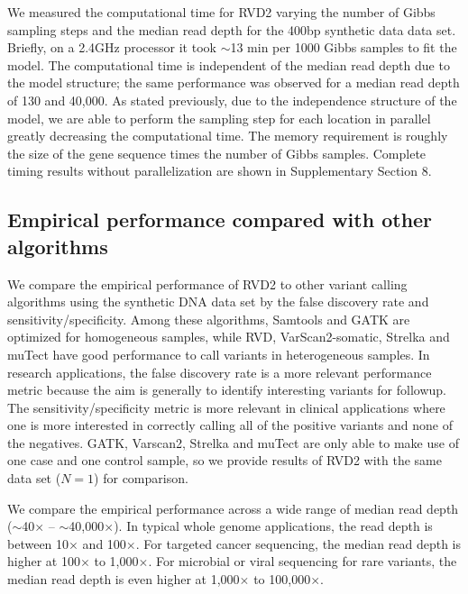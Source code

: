 \documentclass{bioinfo}
\begin{document}
We measured the computational time for RVD2 varying the number of Gibbs sampling steps and the median read depth for the 400bp synthetic data data set. 
Briefly, on a 2.4GHz processor it took $\sim$13 min per 1000 Gibbs samples to fit the model. 
The computational time is independent of the median read depth due to the model structure; the same performance was observed for a median read depth of 130 and 40,000. 
As stated previously, due to the independence structure of the model, we are able to perform the sampling step for each location in parallel greatly decreasing the computational time.
The memory requirement is roughly the size of the gene sequence times the number of Gibbs samples.
Complete timing results without parallelization are shown in Supplementary Section 8.   

\subsection{Empirical performance compared with other algorithms}\label{sec:comparison}

We compare the empirical performance of RVD2 to other variant calling algorithms using the synthetic DNA data set by the false discovery rate and sensitivity/specificity. 
Among these algorithms, Samtools and GATK are optimized for homogeneous samples, while RVD, VarScan2-somatic, Strelka and muTect have good performance to call variants in heterogeneous samples. 
In research applications, the false discovery rate is a more relevant performance metric because the aim is generally to identify interesting variants for followup. 
The sensitivity/specificity metric is more relevant in clinical applications where one is more interested in correctly calling all of the positive variants and none of the negatives. 
GATK, Varscan2, Strelka and muTect are only able to make use of one case and one control sample, so we provide results of RVD2 with the same data set ($N=1$) for comparison.

We compare the empirical performance across a wide range of median read depth ($\sim$40$\times$ -- $\sim$40,000$\times$).
In typical whole genome applications, the read depth is between 10$\times$ and 100$\times$.
For targeted cancer sequencing, the median read depth is higher at 100$\times$ to 1,000$\times$.
For microbial or viral sequencing for rare variants, the median read depth is even higher at 1,000$\times$ to 100,000$\times$. 
\end{document}
